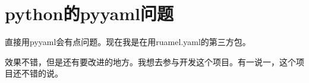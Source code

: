 \section{python的pyyaml问题}

直接用pyyaml会有点问题。现在我是在用ruamel.yaml的第三方包。

效果不错，但是还有要改进的地方。我想去参与开发这个项目。有一说一，这个项目还不错的说。
